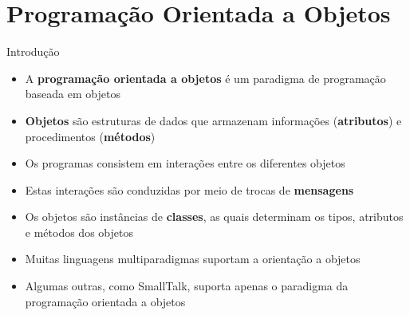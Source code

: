 \section{Programação Orientada a Objetos}

\begin{frame}[fragile]{Introdução}

    \begin{itemize}
        \item A \textbf{programação orientada a objetos} é um paradigma de programação baseada em 
            objetos

        \item \textbf{Objetos} são estruturas de dados que armazenam informações 
            (\textbf{atributos}) e procedimentos (\textbf{métodos})

        \item Os programas consistem em interações entre os diferentes objetos 

        \item Estas interações são conduzidas por meio de trocas de \textbf{mensagens}

        \item Os objetos são instâncias de \textbf{classes}, as quais determinam os tipos, atributos
            e métodos dos objetos

        \item Muitas linguagens multiparadigmas suportam a orientação a objetos

        \item Algumas outras, como SmallTalk, suporta apenas o paradigma da programação orientada a
            objetos
    \end{itemize}

\end{frame}

